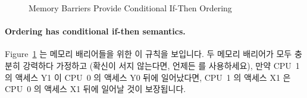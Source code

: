 \begin{figure}[tb]
\centering
{}
\caption{Memory Barriers Provide Conditional If-Then Ordering}
\label{fig:memorder:Memory Barriers Provide Conditional If-Then Ordering}
\end{figure}

\paragraph{Ordering has conditional if-then semantics.}
Figure~\ref{fig:memorder:Memory Barriers Provide Conditional If-Then Ordering}
는 메모리 배리어들을 위한 이 규칙을 보입니다.
두 메모리 배리어가 모두 충분히 강력하다 가정하고 (확신이 서지 않는다면, 언제든
 를 사용하세요), 만약 CPU~1 의 액세스 Y1 이 CPU~0 의 액세스 Y0
뒤에 일어났다면, CPU~1 의 액세스 X1 은 CPU~0 의 액세스 X1 뒤에 일어날 것이
보장됩니다.

